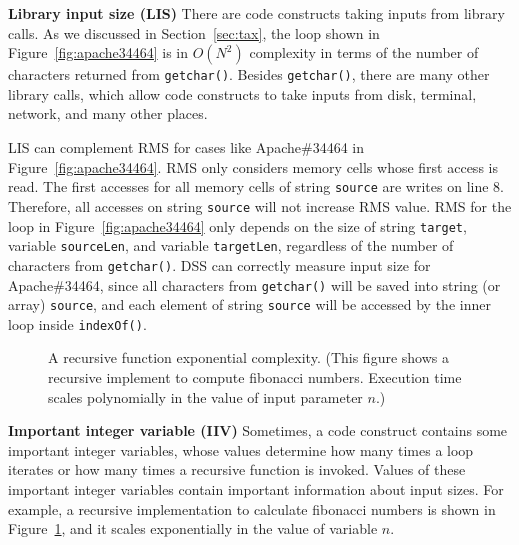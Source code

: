 \noindent\textbf{Library input size (LIS)}
There are code constructs taking inputs from library calls. 
As we discussed in Section~\ref{sec:tax}, 
the loop shown in Figure~\ref{fig:apache34464} 
is in $O(N^2)$ complexity in terms of the number 
of characters returned from \texttt{getchar()}. 
Besides \texttt{getchar()}, there are many other library calls, 
which allow code constructs to take inputs
from disk, terminal, network, and many other places. 

LIS can complement RMS for cases like Apache\#34464 in Figure~\ref{fig:apache34464}.
RMS only considers memory cells whose first access is read. 
The first accesses for all memory cells of string \texttt{source} are writes on line $8$.
Therefore, all accesses on string 
\texttt{source} will not increase RMS value.  
RMS for the loop in Figure~\ref{fig:apache34464} only depends 
on the size of string \texttt{target}, 
variable \texttt{sourceLen}, and variable \texttt{targetLen}, 
regardless of the number of characters from \texttt{getchar()}.
DSS can correctly measure input size for Apache\#34464,
since all characters from \texttt{getchar()} will be saved into 
string (or array) \texttt{source},
and each element of string \texttt{source} 
will be accessed by the inner loop inside \texttt{indexOf()}. 


\begin{figure}
\centering
{}
  \mbox{}
  \vspace{-0.1in}
\caption{A recursive function exponential complexity.
\footnotesize{(This figure shows a recursive implement to compute fibonacci numbers. 
Execution time scales polynomially in the value of input parameter $n$.)}}
\vspace{-0.1in}
\label{fig:fib}
\vspace{-0.15in}
\end{figure}


\noindent\textbf{Important integer variable (IIV)}
Sometimes, a code construct contains some important integer variables,
whose values determine how many times a loop iterates 
or how many times a recursive function is invoked. 
Values of these important integer variables contain important information about input sizes. 
For example, a recursive implementation to calculate fibonacci numbers is shown in Figure~\ref{fig:fib}, 
and it scales exponentially in the value of variable $n$.

